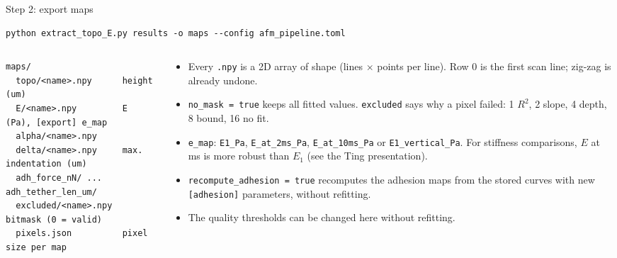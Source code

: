 \documentclass[aspectratio=169,9pt]{beamer}
\begin{document}
\begin{frame}[fragile]{Step 2: export maps}
\begin{lstlisting}
python extract_topo_E.py results -o maps --config afm_pipeline.toml
\end{lstlisting}
\begin{columns}[T]
\begin{column}{0.4\textwidth}
\begin{lstlisting}
maps/
  topo/<name>.npy      height (um)
  E/<name>.npy         E (Pa), [export] e_map
  alpha/<name>.npy
  delta/<name>.npy     max. indentation (um)
  adh_force_nN/ ... adh_tether_len_um/
  excluded/<name>.npy  bitmask (0 = valid)
  pixels.json          pixel size per map
\end{lstlisting}
\end{column}
\begin{column}{0.58\textwidth}\small
\begin{itemize}
\item Every \texttt{.npy} is a 2D array of shape (lines $\times$ points per line). Row 0 is the first scan line; zig-zag is already undone.
\item \texttt{no\_mask = true} keeps all fitted values. \texttt{excluded} says why a pixel failed: 1 $R^2$, 2 slope, 4 depth, 8 bound, 16 no fit.
\item \texttt{e\_map}: \texttt{E1\_Pa}, \texttt{E\_at\_2ms\_Pa}, \texttt{E\_at\_10ms\_Pa} or \texttt{E1\_vertical\_Pa}. For stiffness comparisons, $E$ at ms is more robust than $E_1$ (see the Ting presentation).
\item \texttt{recompute\_adhesion = true} recomputes the adhesion maps from the stored curves with new \texttt{[adhesion]} parameters, without refitting.
\item The quality thresholds can be changed here without refitting.
\end{itemize}
\end{column}
\end{columns}
\end{frame}
\end{document}
